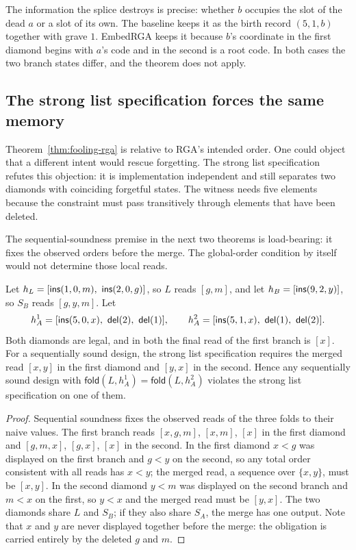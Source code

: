 The information the splice destroys is precise: whether $b$ occupies the
slot of the dead $a$ or a slot of its own. The baseline keeps it as the
birth record $(5,1,b)$ together with grave $1$. EmbedRGA keeps it because
$b$'s coordinate in the first diamond begins with $a$'s code and in the
second is a root code. In both cases the two branch states differ, and the
theorem does not apply.

\subsection{The strong list specification forces the same memory}

Theorem~\ref{thm:fooling-rga} is relative to RGA's intended order. One could
object that a different intent would rescue forgetting. The strong list
specification refutes this objection: it is implementation independent and
still separates two diamonds with coinciding forgetful states. The witness
needs five elements because the constraint must pass transitively through
elements that have been deleted.

The sequential-soundness premise in the next two theorems is load-bearing:
it fixes the observed orders before the merge. The global-order condition by
itself would not determine those local reads.

\begin{theorem}
\label{thm:fooling-strong}
Let $h_L=[\mathsf{ins}(1,0,m),\ \mathsf{ins}(2,0,g)]$, so $L$ reads $[g,m]$, and let
$h_B=[\mathsf{ins}(9,2,y)]$, so $S_B$ reads $[g,y,m]$. Let
\[
 h^1_A=[\ins(5,0,x),\ \del(2),\ \del(1)],\qquad
 h^2_A=[\ins(5,1,x),\ \del(1),\ \del(2)].
\]
Both diamonds are legal, and in both the final read of the first branch is
$[x]$. For a sequentially sound design, the strong list specification
requires the merged read $[x,y]$ in the first diamond and $[y,x]$ in the
second. Hence any sequentially sound design with
$\mathsf{fold}(L,h^1_A)=\mathsf{fold}(L,h^2_A)$ violates the strong list
specification on one of them.
\end{theorem}

\begin{proof}
Sequential soundness fixes the observed reads of the three folds to their
naive values. The first branch reads $[x,g,m]$, $[x,m]$, $[x]$ in the first diamond and
$[g,m,x]$, $[g,x]$, $[x]$ in the second. In the first diamond $x<g$ was
displayed on the first branch and $g<y$ on the second, so any total order
consistent with all reads has $x<y$; the merged read, a sequence over
$\{x,y\}$, must be $[x,y]$. In the second diamond $y<m$ was displayed on the
second branch and $m<x$ on the first, so $y<x$ and the merged read must be
$[y,x]$. The two diamonds share $L$ and $S_B$; if they also share $S_A$, the
merge has one output. Note that $x$ and $y$ are never displayed together
before the merge: the obligation is carried entirely by the deleted $g$ and
$m$.
\end{proof}

